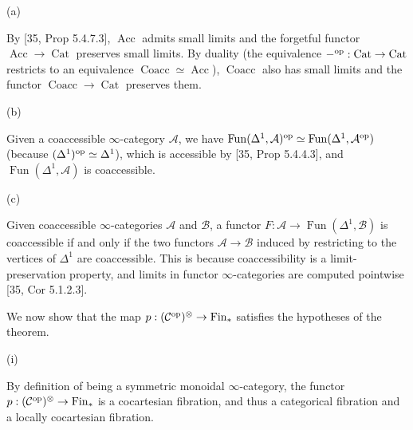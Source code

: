 \par\noindent  (a) 
 
By [35, Prop 5.4.7.3], $\operatorname{Acc}$ admits small limits and the forgetful functor $\operatorname{Acc}\to\operatorname{Cat}$ preserves small limits. By duality (the equivalence $-^{\textnormal{op}}:\operatorname{Cat}\to\operatorname{Cat}$ restricts to an equivalence $\operatorname{Coacc}\simeq\operatorname{Acc}$), $\operatorname{Coacc}$ also has small limits and the functor $\operatorname{Coacc}\to\operatorname{Cat}$ preserves them.\par
 
 
 
\par\noindent  (b) 
 
Given a coaccessible $\infty$-category ${\mathcal{A}}$, we have $\operatorname{Fun}(\Delta^{1},{\mathcal{A}})^{\textnormal{op}}\simeq\operatorname{Fun}(\Delta^{1},{\mathcal{A}}^{\textnormal{op}})$ (because $(\Delta^{1})^{\textnormal{op}}\simeq\Delta^{1}$), which is accessible by [35, Prop 5.4.4.3], and $\operatorname{Fun}(\Delta^{1},{\mathcal{A}})$ is coaccessible.\par
 
 
 
\par\noindent  (c) 
 
Given coaccessible $\infty$-categories ${\mathcal{A}}$ and ${\mathcal{B}}$, a functor $F:{\mathcal{A}}\to\operatorname{Fun}(\Delta^{1},{\mathcal{B}})$ is coaccessible if and only if the two functors ${\mathcal{A}}\to{\mathcal{B}}$ induced by restricting to the vertices of $\Delta^{1}$ are coaccessible. This is because coaccessibility is a limit-preservation property, and limits in functor $\infty$-categories are computed pointwise [35, Cor 5.1.2.3].\par
 
 
  
We now show that the map $p:({\mathcal{C}}^{\textnormal{op}})^{\otimes}\to\operatorname{Fin}_{\ast}$ satisfies the hypotheses of the theorem.\par
  
\par\noindent  (i) 
 
By definition of being a symmetric monoidal $\infty$-category, the functor $p:({\mathcal{C}}^{\textnormal{op}})^{\otimes}\to\operatorname{Fin}_{\ast}$ is a cocartesian fibration, and thus a categorical fibration and a locally cocartesian fibration.\par
 
